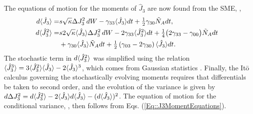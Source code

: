 \documentclass[preprint, aps,pra,onecolumn]{revtex4-1} %
\newcommand{\varz}{\Delta J_3^2}
\newcommand{\jz}{\hat{J}_3}
\newcommand{\NA}{\tilde{N}_A}
\begin{document}
\begin{appendix}
The equations of motion for the moments of $\jz$ are now found from the SME, ,
	\begin{subequations} \label{Eq::J3MomentEquations}
	\begin{align} 
		d \expt{\jz} =& s \sqrt{\kappa} \varz \, dW - \gamma_{33} \expt{\jz}dt + \smallfrac{1}{2} \gamma_{30} \NA dt ,  \\
		d \expt{\jz^2} =& s 2\sqrt{\kappa} \expt{\jz}\Delta J_3^2 \, dW - 2 \gamma_{33} \expt{\jz^2}dt + \smallfrac{1}{4} \big( 2 \gamma_{33}-\gamma_{00}\big) \NA dt \\
		&+ \gamma_{30} \expt{\jz} \NA dt + \smallfrac{1}{2}\left(\gamma_{03} -2 \gamma_{30}\right) \expt{\jz} dt. \nonumber 
	\end{align}
	\end{subequations}
The stochastic term in $d\expt{\jz^2}$ was simplified using the relation $\expt{\jz^3} = 3\expt{\jz^2}\expt{\jz}- 2\expt{\jz}^3$, which comes from Gaussian statistics \cite{jacobs_straightforward_2006}. 
Finally, the It\={o} calculus governing the stochastically evolving moments requires that differentials be taken to second order, and the evolution of the variance is given by $d \varz = d \expt{\jz^2} - 2 \expt{\jz} d \expt{\jz} - ( d \expt{\jz} )^2$. 
The equation of motion for the conditional variance, , then follows from Eqs. (\ref{Eq::J3MomentEquations}).

\end{appendix}
\end{document}
